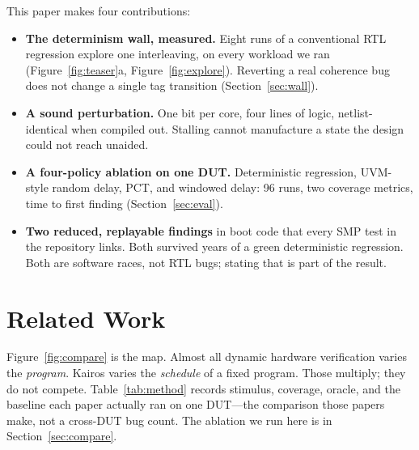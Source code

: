 \documentclass[sigconf,anonymous,review]{acmart}
\begin{document}
This paper makes four contributions:

\begin{itemize}
\item \textbf{The determinism wall, measured.} Eight runs of a
  conventional RTL regression explore one interleaving, on every
  workload we ran (Figure~\ref{fig:teaser}a, Figure~\ref{fig:explore}).
  Reverting a real coherence bug does not change a single tag
  transition (Section~\ref{sec:wall}).
\item \textbf{A sound perturbation.} One bit per core, four lines of
  logic, netlist-identical when compiled out. Stalling cannot manufacture
  a state the design could not reach unaided.
\item \textbf{A four-policy ablation on one DUT.} Deterministic
  regression, UVM-style random delay, PCT, and windowed delay: 96
  runs, two coverage metrics, time to first finding
  (Section~\ref{sec:eval}).
\item \textbf{Two reduced, replayable findings} in boot code that
  every SMP test in the repository links. Both survived years of a
  green deterministic regression. Both are software races, not RTL
  bugs; stating that is part of the result.
\end{itemize}

\section{Related Work}
\label{sec:related}

Figure~\ref{fig:compare} is the map. Almost all dynamic hardware
verification varies the \emph{program}. Kairos varies the
\emph{schedule} of a fixed program. Those multiply; they do not
compete. Table~\ref{tab:method} records stimulus, coverage, oracle, and
the baseline each paper actually ran on one DUT---the comparison those
papers make, not a cross-DUT bug count. The ablation we run here is in
Section~\ref{sec:compare}.

\end{document}
